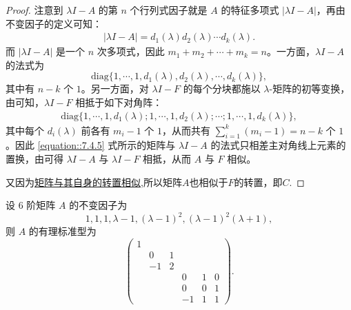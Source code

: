 \documentclass[../../main.tex]{subfiles}
\begin{document}
\begin{proof}
注意到 $\lambda I - A$ 的第 $n$ 个行列式因子就是 $A$ 的特征多项式 $|\lambda I - A|$，再由不变因子的定义可知：
\begin{align*}
|\lambda I - A| = d_1(\lambda)d_2(\lambda)\cdots d_k(\lambda).
\end{align*}
而 $|\lambda I - A|$ 是一个 $n$ 次多项式，因此 $m_1 + m_2 + \cdots + m_k = n$。一方面，$\lambda I - A$ 的法式为
\[
\mathrm{diag}\{1,\cdots,1,d_1(\lambda),d_2(\lambda),\cdots,d_k(\lambda)\},
\]
其中有 $n - k$ 个 $1$。另一方面，对 $\lambda I - F$ 的每个分块都施以 $\lambda$-矩阵的初等变换，由可知，$\lambda I - F$ 相抵于如下对角阵：
\begin{align}
\mathrm{diag}\{1,\cdots,1,d_1(\lambda);1,\cdots,1,d_2(\lambda);\cdots;1,\cdots,1,d_k(\lambda)\},
\label{equation::7.4.5}
\end{align}
其中每个 $d_i(\lambda)$ 前各有 $m_i - 1$ 个 $1$，从而共有 $\sum_{i = 1}^{k}(m_i - 1)=n - k$ 个 $1$。因此 \eqref{equation::7.4.5} 式所示的矩阵与 $\lambda I - A$ 的法式只相差主对角线上元素的置换，由可得 $\lambda I - A$ 与 $\lambda I - F$ 相抵，从而 $A$ 与 $F$ 相似。

又因为\hyperref[proposition:lambda-矩阵一定与其转置相似]{矩阵与其自身的转置相似},所以矩阵$A$也相似于$F$的转置，即$C$.
\end{proof}

\begin{example}
设 6 阶矩阵 $A$ 的不变因子为
\[
1,1,1,\lambda - 1,(\lambda - 1)^2,(\lambda - 1)^2(\lambda + 1),
\]
则 $A$ 的有理标准型为
\[
\begin{pmatrix}
1 & & & & & \\
& 0 & 1 & & & \\
& -1 & 2 & & & \\
& & & 0 & 1 & 0 \\
& & & 0 & 0 & 1 \\
& & & -1 & 1 & 1
\end{pmatrix}.
\] 
\end{example}
\end{document}
